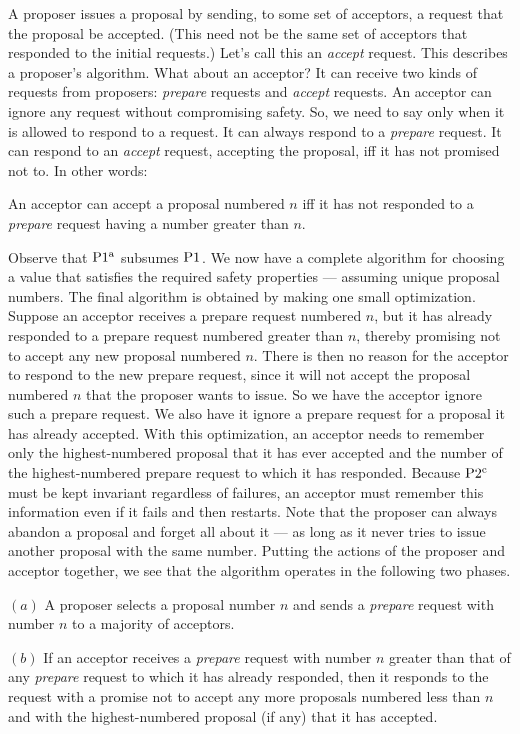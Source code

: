 A proposer issues a proposal by sending, to some set of acceptors, a request that the proposal be accepted.
(This need not be the same set of acceptors that responded to the initial requests.)
Let's call this an \emph{accept} request.
This describes a proposer's algorithm.
What about an acceptor?
It can receive two kinds of requests from proposers: \emph{prepare} requests and \emph{accept} requests.
An acceptor can ignore any request without compromising safety.
So, we need to say only when it is allowed to respond to a request.
It can always respond to a \emph{prepare} request.
It can respond to an \emph{accept} request, accepting the proposal, iff it has not promised not to.
In other words:

\begin{paxostheoremenv}[$\PaxosSubtheorem{1}{a}$]
    An acceptor can accept a proposal numbered $n$ iff it has not responded to a \emph{prepare} request having a number greater than $n$.
\end{paxostheoremenv}

Observe that $\PaxosSubtheorem{1}{a}$ subsumes $\operatorname{P1^{}}$.
We now have a complete algorithm for choosing a value that satisfies the required safety properties — assuming unique proposal numbers.
The final algorithm is obtained by making one small optimization.
Suppose an acceptor receives a prepare request numbered $n$, but it has already responded to a prepare request numbered greater than $n$, thereby promising not to accept any new proposal numbered $n$.
There is then no reason for the acceptor to respond to the new prepare request, since it will not accept the proposal numbered $n$ that the proposer wants to issue.
So we have the acceptor ignore such a prepare request.
We also have it ignore a prepare request for a proposal it has already accepted.
With this optimization, an acceptor needs to remember only the highest-numbered proposal that it has ever accepted and the number of the highest-numbered prepare request to which it has responded.
Because $\operatorname{P2^{c}}$ must be kept invariant regardless of failures, an acceptor must remember this information even if it fails and then restarts.
Note that the proposer can always abandon a proposal and forget all about it — as long as it never tries to issue another proposal with the same number.
Putting the actions of the proposer and acceptor together, we see that the algorithm operates in the following two phases.

\begin{phase}
    $(a)$ A proposer selects a proposal number $n$ and sends a \emph{prepare} request with number $n$ to a majority of acceptors.
    
    $(b)$ If an acceptor receives a \emph{prepare} request with number $n$ greater than that of any \emph{prepare} request to which it has already responded, then it responds to the request with a promise not to accept any more proposals numbered less than $n$ and with the highest-numbered proposal (if any) that it has accepted.
\end{phase}

